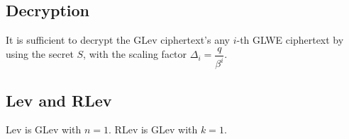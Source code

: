 \subsection{Decryption}

It is sufficient to decrypt the GLev ciphertext's any $i$-th GLWE ciphertext by using the secret $S$, with the scaling factor $\Delta_i = \dfrac{q}{\beta^i}$.


\subsection{Lev and RLev}

Lev is GLev with $n=1$. RLev is GLev with $k=1$.


